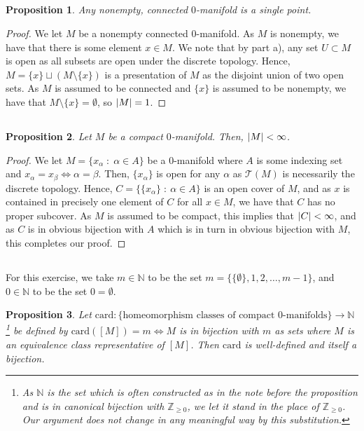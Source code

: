 \documentclass[english]{article}
\DeclarePairedDelimiter\abs{\lvert}{\rvert}%
\newcommand{\NN}{\mathbb{N}}
\newcommand{\ZZ}{\mathbb{Z}}
\newcommand{\prt}[1]{\setcounter{subsection}{#1-1}\subsection{}}
\newtheorem*{proposition*}{Proposition}
\theoremstyle{remark}
\theoremstyle{definition}
\newcommand{\Tt}{\mathcal{T}}
\newcommand{\card}{\mathrm{card}}
\begin{document}
\prt{2}\begin{proposition*}
	Any nonempty, connected $0$-manifold is a single point.
\end{proposition*}
\begin{proof} We let $M$ be a nonempty connected $0$-manifold.
	 As $M$ is nonempty, we have that there is some element $x\in M$. We note that by part a), any set $U\subset M$ is open as all subsets are open under the discrete topology. Hence, $M=\{x\}\sqcup (M\setminus \{x\})$ is a presentation of $M$ as the disjoint union of two open sets. As $M$ is assumed to be connected and $\{x\}$ is assumed to be nonempty, we have that $M\setminus \{x\}=\emptyset$, so $\abs{M}=1$.
\end{proof}
 \prt{3} \begin{proposition*}
 Let $M$ be a compact $0$-manifold. Then, $\abs{M}<\infty$.
 \end{proposition*}
\begin{proof}
	We let $M=\{x_\alpha \;:\; \alpha\in A\}$ be a $0$-manifold where $A$ is some indexing set and $x_\alpha=x_\beta\iff \alpha=\beta$. Then, $\{x_\alpha\}$ is open for any $\alpha$ as $\Tt(M)$ is necessarily the discrete topology. Hence, $C=\{\{x_\alpha\}\;:\: \alpha\in A\}$ is an open cover of $M$, and as $x$ is contained in precisely one element of $C$ for all $x\in M$, we have that $C$ has no proper subcover. As $M$ is assumed to be compact, this implies that $\abs{C}<\infty$, and as $C$ is in obvious bijection with $A$ which is in turn in obvious bijection with $M$, this completes our proof.
\end{proof}
\prt{4}
For this exercise, we take $m\in \NN$ to be the set $m=\{\{\emptyset\},1,2,\hdots,m-1\}$, and $0\in \NN$ to be the set $0=\emptyset$.
 \begin{proposition*}
	Let $\card:\{\text{homeomorphism classes of compact 0-manifolds}\}\to \NN$\footnote{As $\NN$ is the set which is often constructed as in the note before the proposition and is in canonical bijection with $\ZZ_{\geq 0}$, we let it stand in the place of $\ZZ_{\geq 0}$. Our argument does not change in any meaningful way by this substitution.} be defined by $\card([M])=m\iff M$ is in bijection with $m$ as sets where $M$ is an equivalence class representative of $[M]$. Then $\card$ is well-defined and itself a bijection.
\end{proposition*}
\end{document}
